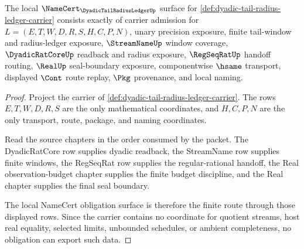 \begin{theorem}
\label{thm:dyadic-tail-radius-ledger-namecert-obligations}
The local $\NameCert_{\DyadicTailRadiusLedgerUp}$ surface for \autoref{def:dyadic-tail-radius-ledger-carrier} consists exactly of carrier admission for $L=(E,T,W,D,R,S,H,C,P,N)$, unary precision exposure, finite tail-window and radius-ledger exposure, $\StreamNameUp$ window coverage, $\DyadicRatCoreUp$ readback and radius exposure, $\RegSeqRatUp$ handoff routing, $\RealUp$ seal-boundary exposure, componentwise $\hsame$ transport, displayed $\Cont$ route replay, $\Pkg$ provenance, and local naming.
\end{theorem}
\begin{proof}
Project the carrier of \autoref{def:dyadic-tail-radius-ledger-carrier}. The rows $E,T,W,D,R,S$ are the only mathematical coordinates, and $H,C,P,N$ are the only transport, route, package, and naming coordinates.

Read the source chapters in the order consumed by the packet. The DyadicRatCore row supplies dyadic readback, the StreamName row supplies finite windows, the RegSeqRat row supplies the regular-rational handoff, the Real observation-budget chapter supplies the finite budget discipline, and the Real chapter supplies the final seal boundary.

The local NameCert obligation surface is therefore the finite route through those displayed rows. Since the carrier contains no coordinate for quotient streams, host real equality, selected limits, unbounded schedules, or ambient completeness, no obligation can export such data.
\end{proof}

